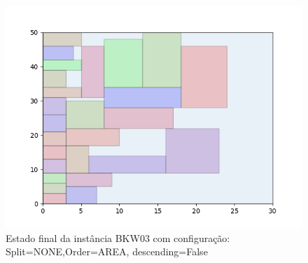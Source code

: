 \begin{figure}[H]
    \centering
    \caption[]{Estado final da instância BKW03 com configuração: Split=NONE,Order=AREA, descending=False}
    \label{fig:bkw03-none-area-false}
    \includegraphics[scale=0.5]{output/figures/bkw/bkw03/none/area/false/00}
\end{figure}